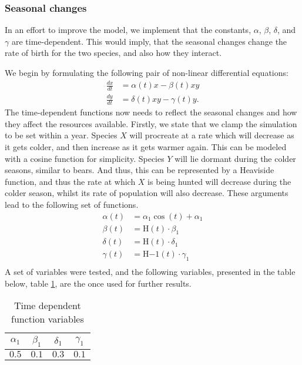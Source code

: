 \documentclass[a4paper]{article}
\newcommand{\newparagraph}{\vspace{.5cm}\noindent}
\begin{document}
\subsubsection{Seasonal changes}
In an effort to improve the model, we implement that the constants, $\alpha$, $\beta$, $\delta$, and $\gamma$ are time-dependent.
This would imply, that the seasonal changes change the rate of birth for the two species, and also how they interact.

\newparagraph
We begin by formulating the following pair of non-linear differential equations:
\begin{align}
    \frac{dx}{dt} &= \alpha(t) x - \beta(t) xy \nonumber\\
    \frac{dy}{dt} &= \delta(t) xy - \gamma(t) y.\label{eq: lv time dependent}
\end{align}The time-dependent functions now needs to reflect the seasonal changes and how they affect the resources available. Firstly, we state that we clamp the simulation to be set within a year. Species $X$ will procreate at a rate which will decrease as it gets colder, and then increase as it gets warmer again. This can be modeled with a cosine function for simplicity. Species $Y$ will lie dormant during the colder seasons, similar to bears. And thus, this can be represented by a Heaviside function, and thus the rate at which $X$ is being hunted will decrease during the colder season, whilst its rate of population will also decrease. These arguments lead to the following set of functions.
\begin{align*}
    \alpha(t) &= \alpha_1\cos(t)+ \alpha_1\\
    \beta(t) &=  \text{H}(t)\cdot \beta_1\\
    \delta(t) &= \text{H}(t)\cdot \delta_1\\
    \gamma(t) &= \text{H}{-1}(t)\cdot \gamma_1\\
\end{align*}A set of variables were tested, and the following variables, presented in the table below, table \ref{tab: t variables}, are the once used for further results.
\begin{table}[H]
    \centering
    \caption{Time dependent function variables}
    \begin{tabular}{|c|c|c|c|}\hline
        $\alpha_1$ & $\beta_1$ & $\delta_1$ & $\gamma_1$ \\\hline
        $0.5$ & $0.1$ & $0.3$ & $0.1$\\\hline
    \end{tabular}
    \label{tab: t variables}
\end{table}\noindent
\end{document}
